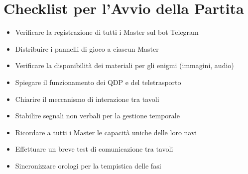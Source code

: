 \documentclass[11pt,a4paper]{article}
\begin{document}
\section{Checklist per l'Avvio della Partita}

\begin{tcolorbox}[colback=masterlightpurple!10, colframe=masterpurple]
\begin{itemize}[leftmargin=*]
\item Verificare la registrazione di tutti i Master sul bot Telegram
\item Distribuire i pannelli di gioco a ciascun Master
\item Verificare la disponibilità dei materiali per gli enigmi (immagini, audio)
\item Spiegare il funzionamento dei QDP e del teletrasporto
\item Chiarire il meccanismo di interazione tra tavoli
\item Stabilire segnali non verbali per la gestione temporale
\item Ricordare a tutti i Master le capacità uniche delle loro navi
\item Effettuare un breve test di comunicazione tra tavoli
\item Sincronizzare orologi per la tempistica delle fasi
\end{itemize}
\end{tcolorbox}
\end{document}
